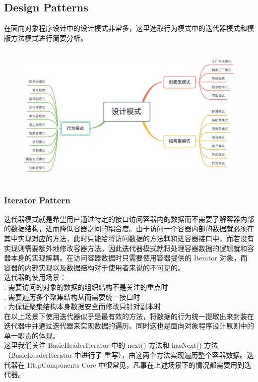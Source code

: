 \documentclass{article}
\begin{document}
	\clearpage
	\subsection{Design Patterns}
	\begin{CJK}{UTF8}{gbsn}
		\indent \indent 在面向对象程序设计中的设计模式非常多，这里选取行为模式中的迭代器模式和模版方法模式进行简要分析。
	\end{CJK}{}
	\begin{figure}[H]
		\centering
		\includegraphics[height = 7cm, width = 13.5cm]{pics/35_Design_Patterns.png}	
	\end{figure}
	\subsubsection{Iterator Pattern}
	\begin{CJK}{UTF8}{gbsn}
		\indent \indent 迭代器模式就是希望用户通过特定的接口访问容器内的数据而不需要了解容器内部的数据结构，进而降低容器之间的耦合度。由于访问一个容器内部的数据就必须在其中实现对应的方法，此时只能给将访问数据的方法耦和进容器接口中，而若没有实现则需要额外地修改容器方法。因此迭代器模式就将处理容器数据的逻辑就和容器本身的实现解耦。在访问容器数据时只需要使用容器提供的 Iterator 对象，而容器的内部实现以及数据结构对于使用者来说的不可见的。\\
		\indent 迭代器的使用场景：\\
		\indent {}. 需要访问的对象的数据的组织结构不是关注的重点时\\
		\indent {}. 需要遍历多个聚集结构从而需要统一接口时\\
		\indent {}. 为保证聚集结构本身数据安全而修改只针对副本时\\
		\indent 在以上场景下使用迭代器似乎是最有效的方法，将数据的行为统一提取出来封装在迭代器中并通过迭代器来实现数据的遍历。同时这也是面向对象程序设计原则中的单一职责的体现。\\
		\indent 这里我们关注 BasicHeaderIterator 中的 next() 方法和 hasNext() 方法（BasicHeaderIterator 中进行了 重写），由这两个方法实现遍历整个容器数据。迭代器在 HttpComponents Core 中很常见，凡事在上述场景下的情况都需要用到迭代器。
	\end{CJK}{}
\end{document}
